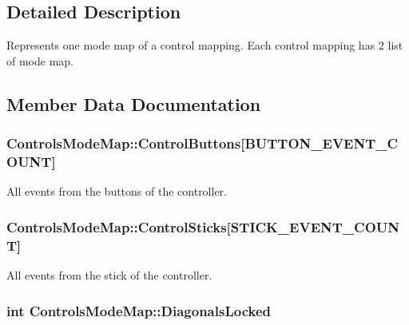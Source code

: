 \subsection{Detailed Description}
Represents one mode map of a control mapping. Each control mapping has 2 list of mode map. 

\subsection{Member Data Documentation}
\subsubsection[{\texorpdfstring{Control\+Buttons}{ControlButtons}}]{ Controls\+Mode\+Map\+::\+Control\+Buttons\mbox{[}{\bf B\+U\+T\+T\+O\+N\+\_\+\+E\+V\+E\+N\+T\+\_\+\+C\+O\+U\+NT}\mbox{]}}\hypertarget{struct_controls_mode_map_a3b54c773477b561b1fbc505556251717}{}\label{struct_controls_mode_map_a3b54c773477b561b1fbc505556251717}


All events from the buttons of the controller. 

\subsubsection[{\texorpdfstring{Control\+Sticks}{ControlSticks}}]{ Controls\+Mode\+Map\+::\+Control\+Sticks\mbox{[}{\bf S\+T\+I\+C\+K\+\_\+\+E\+V\+E\+N\+T\+\_\+\+C\+O\+U\+NT}\mbox{]}}\hypertarget{struct_controls_mode_map_a022bc6ccf4b8c655b152d134c4738b1c}{}\label{struct_controls_mode_map_a022bc6ccf4b8c655b152d134c4738b1c}


All events from the stick of the controller. 

\subsubsection[{\texorpdfstring{Diagonals\+Locked}{DiagonalsLocked}}]{\setlength{\rightskip}{0pt plus 5cm}int Controls\+Mode\+Map\+::\+Diagonals\+Locked}\hypertarget{struct_controls_mode_map_af46c342653f85b90f59c677972c2e905}{}\label{struct_controls_mode_map_af46c342653f85b90f59c677972c2e905}


